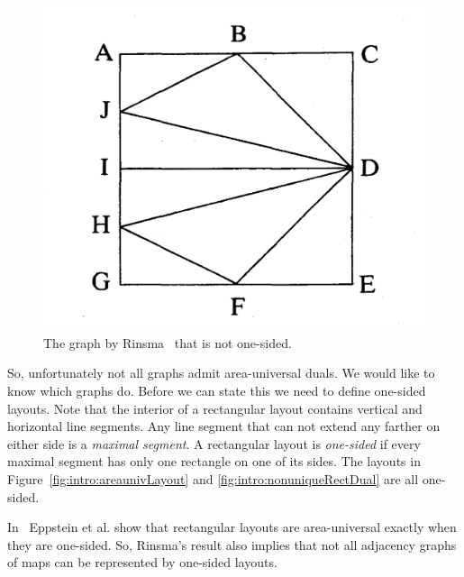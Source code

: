   \begin{figure}  %
    \includegraphics[scale=.15]{introduction/img/rinsma.png}
    \caption{The graph by Rinsma~\cite{Rinsma1987} that is not one-sided.}
    \label{fig:intro:rinsma}
  \end{figure}

  So, unfortunately not all graphs admit area-universal duals.
  We would like to know which graphs do.
  Before we can state this we need to define one-sided layouts.
  Note that the interior of a rectangular layout contains vertical and horizontal line segments.
  Any line segment that can not extend any farther on either side is a \emph{maximal segment}.
  A rectangular layout is \emph{one-sided} if every maximal segment has only one rectangle on one of its sides.
  The layouts in Figure~\ref{fig:intro:areaunivLayout} and  \ref{fig:intro:nonuniqueRectDual} are all one-sided.

  In~\cite{Eppstein2012} Eppstein et al. show that rectangular layouts are area-universal exactly when they are one-sided.
  So, Rinsma's result also implies that not all adjacency graphs of maps can be represented by one-sided layouts.


